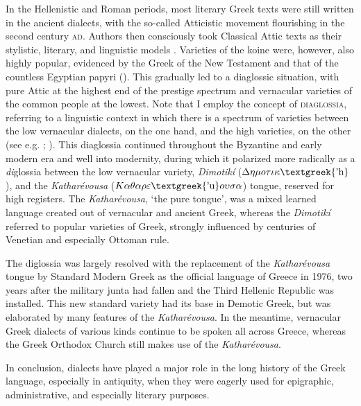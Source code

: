In the Hellenistic and Roman periods, most literary Greek texts were still written in the ancient dialects, with the so-called Atticistic movement flourishing in the second century \textsc{ad}. Authors then consciously took Classical Attic texts as their stylistic, literary, and linguistic models \citep[42]{Whitmarsh2005}. Varieties of the koine were, however, also highly popular, evidenced by the Greek of the New Testament and that of the countless Egyptian papyri (\citealt{EvansObbink2010}). This gradually led to a diaglossic situation, with pure Attic at the highest end of the prestige spectrum and vernacular varieties of the common people at the lowest. Note that I employ the concept of \textsc{diaglossia}, referring to a linguistic context in which there is a spectrum of varieties between the low vernacular dialects, on the one hand, and the high varieties, on the other (see e.g. \citealt{Auer2005}; \citealt{Rutten2016}). This diaglossia continued throughout the Byzantine and early modern era and well into modernity, during which it polarized more radically as a \textit{di}glossia between the low vernacular variety, \textit{Dimotikí} ($\Delta \eta \mu o\tau \iota \kappa \text{\textgreek{'h}}$), and the \textit{Katharévousa} ($K\alpha \theta \alpha \rho \varepsilon \text{\textgreek{'u}}o\upsilon \sigma \alpha $) tongue, reserved for high registers. The \textit{Katharévousa}, ‘the pure tongue’, was a mixed learned language created out of vernacular and ancient Greek, whereas the \textit{Dimotikí} referred to popular varieties of Greek, strongly influenced by centuries of Venetian and especially Ottoman rule.

The diglossia was largely resolved with the replacement of the \textit{Katharévousa} tongue by Standard Modern Greek as the official language of Greece in 1976, two years after the military junta had fallen and the Third Hellenic Republic was installed. This new standard variety had its base in Demotic Greek, but was elaborated by many features of the \textit{Katharévousa}. In the meantime, vernacular Greek dialects of various kinds continue to be spoken all across Greece, whereas the Greek Orthodox Church still makes use of the \textit{Katharévousa}.

In conclusion, dialects have played a major role in the long history of the Greek language, especially in antiquity, when they were eagerly used for epigraphic, administrative, and especially literary purposes.

